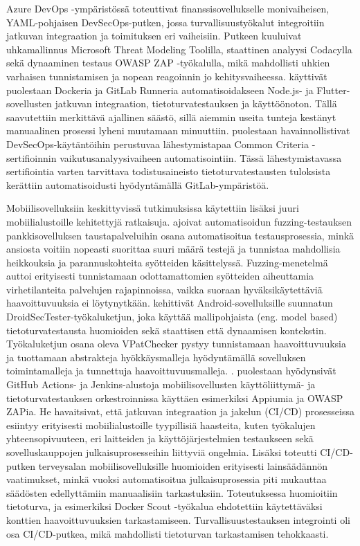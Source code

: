 \documentclass[bscthesis,finnish,oneside,biblatex]{uefcsthesis}
\begin{document}
    Azure DevOps -ympäristössä \cite{kushwaha2024_cct} toteuttivat finanssisovellukselle monivaiheisen, YAML-pohjaisen DevSecOps-putken, jossa turvallisuustyökalut integroitiin jatkuvan integraation ja toimituksen eri vaiheisiin. Putkeen kuuluivat uhkamallinnus Microsoft Threat Modeling Toolilla, staattinen analyysi Codacylla sekä dynaaminen testaus OWASP ZAP -työkalulla, mikä mahdollisti uhkien varhaisen tunnistamisen ja nopean reagoinnin jo kehitysvaiheessa. \cite{putra2022_devsecops} käyttivät puolestaan Dockeria ja GitLab Runneria automatisoidakseen Node.js- ja Flutter-sovellusten jatkuvan integraation, tietoturvatestauksen ja käyttöönoton. Tällä saavutettiin merkittävä ajallinen säästö, sillä aiemmin useita tunteja kestänyt manuaalinen prosessi lyheni muutamaan minuuttiin. \cite{dupont2021_incremental} puolestaan havainnollistivat DevSecOps-käytäntöihin perustuvaa lähestymistapaa Common Criteria -sertifioinnin vaikutusanalyysivaiheen automatisointiin. Tässä lähestymistavassa sertifiointia varten tarvittava todistusaineisto tietoturvatestausten tuloksista kerättiin automatisoidusti hyödyntämällä GitLab-ympäristöä.

    Mobiilisovelluksiin keskittyvissä tutkimuksissa käytettiin lisäksi juuri mobiilialustoille kehitettyjä ratkaisuja. \cite{schneider_2020_fuzzing} ajoivat automatisoidun fuzzing-testauksen pankkisovelluksen taustapalveluihin osana automatisoitua testausprosessia, minkä ansiosta voitiin nopeasti suorittaa suuri määrä testejä ja tunnistaa mahdollisia heikkouksia ja parannuskohteita syötteiden käsittelyssä. Fuzzing-menetelmä auttoi erityisesti tunnistamaan odottamattomien syötteiden aiheuttamia virhetilanteita palvelujen rajapinnoissa, vaikka suoraan hyväksikäytettäviä haavoittuvuuksia ei löytynytkään. \cite{baheux2023_droidsectester} kehittivät Android-sovelluksille suunnatun DroidSecTester-työkaluketjun, joka käyttää mallipohjaista (eng. model based) tietoturvatestausta huomioiden sekä staattisen että dynaamisen kontekstin. Työkaluketjun osana oleva VPatChecker pystyy tunnistamaan haavoittuvuuksia ja tuottamaan abstrakteja hyökkäysmalleja hyödyntämällä sovelluksen toimintamalleja ja tunnettuja haavoittuvuusmalleja. \cite{ozdenizci2024mobilizing}. puolestaan hyödynsivät GitHub Actions- ja Jenkins-alustoja mobiilisovellusten käyttöliittymä- ja tietoturvatestauksen orkestroinnissa käyttäen esimerkiksi Appiumia ja OWASP ZAPia. He havaitsivat, että jatkuvan integraation ja jakelun (CI/CD) prosesseissa esiintyy erityisesti mobiilialustoille tyypillisiä haasteita, kuten työkalujen yhteensopivuuteen, eri laitteiden ja käyttöjärjestelmien testaukseen sekä sovelluskauppojen julkaisuprosesseihin liittyviä ongelmia. Lisäksi \cite{byman2024continuous} toteutti CI/CD-putken terveysalan mobiilisovelluksille huomioiden erityisesti lainsäädännön vaatimukset, minkä vuoksi automatisoitua julkaisuprosessia piti mukauttaa säädösten edellyttämiin manuaalisiin tarkastuksiin. Toteutuksessa huomioitiin tietoturva, ja esimerkiksi Docker Scout -työkalua ehdotettiin käytettäväksi konttien haavoittuvuuksien tarkastamiseen. Turvallisuustestauksen integrointi oli osa CI/CD-putkea, mikä mahdollisti tietoturvan tarkastamisen tehokkaasti.
\end{document}
